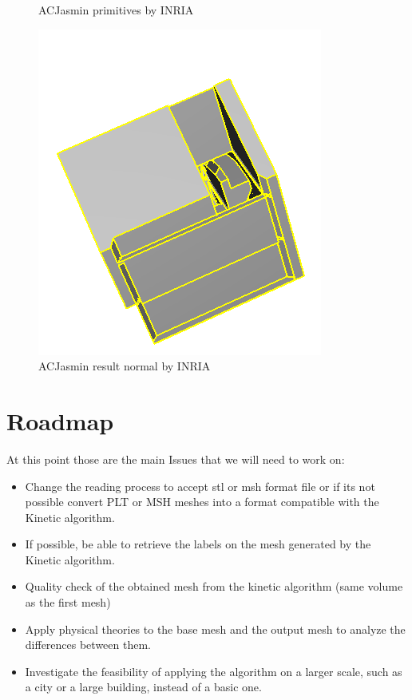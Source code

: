 \documentclass{article}
\begin{document}
\begin{figure}[H]
\begin{minipage}[t]{0.29\textwidth}
    \caption*{ACJasmin primitives by INRIA}
  \end{minipage}
  \begin{minipage}[t]{0.27\textwidth}
    \includegraphics[width=\textwidth]{../../images/screen_kinetic/ACJasmin_result_INRIA.png}
    \caption*{ACJasmin result normal by INRIA}
  \end{minipage}
\end{figure}  
\newpage


\section{Roadmap}
At this point those are the main Issues that we will need to work on:
\begin{itemize}
  
  \item Change the reading process to accept stl or msh format file or if its not possible
  convert PLT or MSH meshes into a format compatible with the Kinetic algorithm.
  \item If possible, be able to retrieve the labels on the mesh generated by the Kinetic algorithm.
  \item Quality check of the obtained mesh from the kinetic algorithm (same volume as the first mesh)
  \item Apply physical theories to the base mesh and the output mesh to analyze the differences between them.
  \item Investigate the feasibility of applying the algorithm on a larger scale, such as a city or a large building, instead of a basic one.
\end{itemize}
\end{document}
